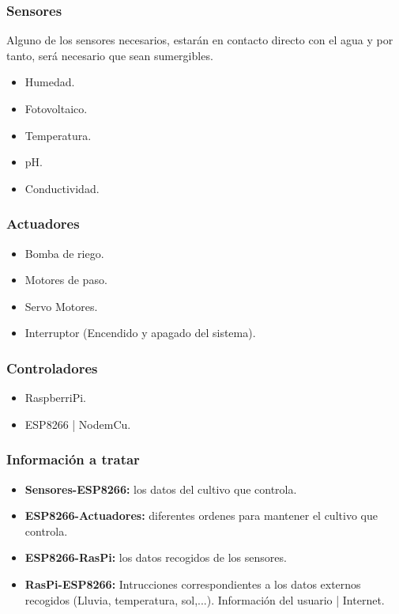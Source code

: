 \documentclass[12pt,a4paper,titlepage,oneside]{report}
\begin{document}
	\subsubsection*{Sensores}
	Alguno de los sensores necesarios, estarán en contacto directo con el agua y por tanto, será necesario que sean sumergibles.
		\begin{itemize}
			\item Humedad.
			\item Fotovoltaico.
			\item Temperatura.
			\item pH.
			\item Conductividad.
		\end{itemize}

	\subsubsection*{Actuadores}

		\begin{itemize}
			\item Bomba de riego.
			\item Motores de paso.
			\item Servo Motores.
			\item Interruptor (Encendido y apagado del sistema).
		\end{itemize}			
	
	\subsubsection*{Controladores}
		
		\begin{itemize}
			\item RaspberriPi.
			\item ESP8266 | NodemCu.
		\end{itemize}			
	
	\subsubsection*{Información a tratar}
		
		\begin{itemize}
			\item \textbf{Sensores-ESP8266:} los datos del cultivo que controla.
			\item \textbf{ESP8266-Actuadores:} diferentes ordenes para mantener el cultivo que controla.
			\item \textbf{ESP8266-RasPi:} los datos recogidos de los sensores.
			\item \textbf{RasPi-ESP8266:} Intrucciones correspondientes a los datos externos recogidos (Lluvia, temperatura, sol,...). Información del usuario | Internet.
			
		\end{itemize}
\end{document}
